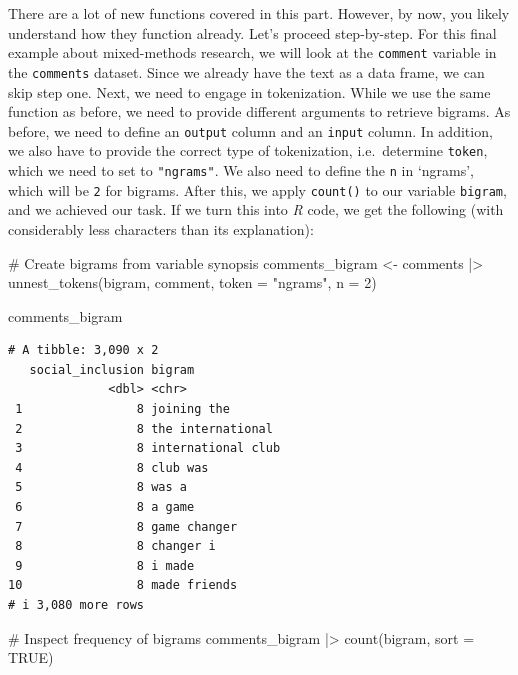 \documentclass[
  letterpaper,
]{krantz}
\makeatletter
\newenvironment{Shaded}{\begin{snugshade}}{\end{snugshade}}
\newcommand{\AttributeTok}[1]{\textcolor[rgb]{0.40,0.45,0.13}{#1}}
\newcommand{\CommentTok}[1]{\textcolor[rgb]{0.37,0.37,0.37}{#1}}
\newcommand{\ConstantTok}[1]{\textcolor[rgb]{0.56,0.35,0.01}{#1}}
\newcommand{\DecValTok}[1]{\textcolor[rgb]{0.68,0.00,0.00}{#1}}
\newcommand{\FunctionTok}[1]{\textcolor[rgb]{0.28,0.35,0.67}{#1}}
\newcommand{\NormalTok}[1]{\textcolor[rgb]{0.00,0.23,0.31}{#1}}
\newcommand{\OtherTok}[1]{\textcolor[rgb]{0.00,0.23,0.31}{#1}}
\newcommand{\SpecialCharTok}[1]{\textcolor[rgb]{0.37,0.37,0.37}{#1}}
\newcommand{\StringTok}[1]{\textcolor[rgb]{0.13,0.47,0.30}{#1}}
\newenvironment{kframe}{%
\medskip{}
\setlength{\fboxsep}{.8em}
 \def\at@end@of@kframe{}%
 \ifinner\ifhmode%
  \def\at@end@of@kframe{\end{minipage}}%
  \begin{minipage}{\columnwidth}%
 \fi\fi%
 \def\FrameCommand##1{\hskip\@totalleftmargin \hskip-\fboxsep
 \colorbox{shadecolor}{##1}\hskip-\fboxsep
     \hskip-\linewidth \hskip-\@totalleftmargin \hskip\columnwidth}%
 \MakeFramed {\advance\hsize-\width
   \@totalleftmargin\z@ \linewidth\hsize
   \@setminipage}}%
 {\par\unskip\endMakeFramed%
 \at@end@of@kframe}
\renewenvironment{Shaded}{\begin{kframe}}{\end{kframe}}
\makeatother
\begin{document}
There are a lot of new functions covered in this part. However, by now,
you likely understand how they function already. Let's proceed
step-by-step. For this final example about mixed-methods research, we
will look at the \texttt{comment} variable in the \texttt{comments}
dataset. Since we already have the text as a data frame, we can skip
step one. Next, we need to engage in tokenization. While we use the same
function as before, we need to provide different arguments to retrieve
bigrams. As before, we need to define an \texttt{output} column and an
\texttt{input} column. In addition, we also have to provide the correct
type of tokenization, i.e.~determine \texttt{token}, which we need to
set to \texttt{"ngrams"}. We also need to define the \texttt{n} in
`ngrams', which will be \texttt{2} for bigrams. After this, we apply
\texttt{count()} to our variable \texttt{bigram}, and we achieved our
task. If we turn this into \emph{R} code, we get the following (with
considerably less characters than its explanation):

\begin{Shaded}
\begin{Highlighting}[]
\CommentTok{\# Create bigrams from variable synopsis}
\NormalTok{comments\_bigram }\OtherTok{\textless{}{-}}
\NormalTok{  comments }\SpecialCharTok{|\textgreater{}}
  \FunctionTok{unnest\_tokens}\NormalTok{(bigram, comment, }\AttributeTok{token =} \StringTok{"ngrams"}\NormalTok{, }\AttributeTok{n =} \DecValTok{2}\NormalTok{)}

\NormalTok{comments\_bigram}
\end{Highlighting}
\end{Shaded}

\begin{verbatim}
# A tibble: 3,090 x 2
   social_inclusion bigram            
              <dbl> <chr>             
 1                8 joining the       
 2                8 the international 
 3                8 international club
 4                8 club was          
 5                8 was a             
 6                8 a game            
 7                8 game changer      
 8                8 changer i         
 9                8 i made            
10                8 made friends      
# i 3,080 more rows
\end{verbatim}

\begin{Shaded}
\begin{Highlighting}[]
\CommentTok{\# Inspect frequency of bigrams}
\NormalTok{comments\_bigram }\SpecialCharTok{|\textgreater{}} \FunctionTok{count}\NormalTok{(bigram, }\AttributeTok{sort =} \ConstantTok{TRUE}\NormalTok{)}
\end{Highlighting}
\end{Shaded}
\end{document}
